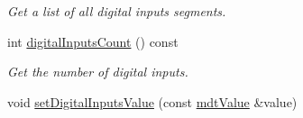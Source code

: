 \begin{DoxyCompactItemize}
\begin{DoxyCompactList}\small\item\em Get a list of all digital inputs segments. \end{DoxyCompactList}\item 
\hypertarget{classmdt_device_ios_a8d6306c16a25c82d6d8002020f4dc16a}{
int \hyperlink{classmdt_device_ios_a8d6306c16a25c82d6d8002020f4dc16a}{digitalInputsCount} () const }
\label{classmdt_device_ios_a8d6306c16a25c82d6d8002020f4dc16a}

\begin{DoxyCompactList}\small\item\em Get the number of digital inputs. \end{DoxyCompactList}\item 
\hypertarget{classmdt_device_ios_a136d4a817fbd14c375ff068c436f3eeb}{
void \hyperlink{classmdt_device_ios_a136d4a817fbd14c375ff068c436f3eeb}{setDigitalInputsValue} (const \hyperlink{classmdt_value}{mdtValue} \&value)}
\label{classmdt_device_ios_a136d4a817fbd14c375ff068c436f3eeb}


\end{DoxyCompactItemize}
